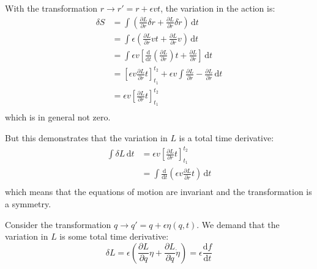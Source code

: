 \documentclass[12pt]{article}
\begin{document}



\pagebreak
\section*{}




With the transformation $r \to r' = r + \epsilon v t$, the variation in the action is:
\begin{equation}
    \begin{split}
        \delta S &= \int \left( \frac{\partial L}{\partial r} \delta r + \frac{\partial L}{\partial \dot{r}} \delta \dot{r} \right) \, \mathrm{d}t \\
        &= \int \epsilon \left( \frac{\partial L}{\partial r} vt + \frac{\partial L}{\partial \dot{r}} v \right) \, \mathrm{d}t \\
        &= \int \epsilon v \left[ \frac{\mathrm{d}}{\mathrm{d}t} \left( \frac{\partial L}{\partial \dot{r}} \right) t + \frac{\partial L}{\partial \dot{r}} \right] \, \mathrm{d}t \\
        &= \left[ \epsilon v \frac{\partial L}{\partial \dot{r}} t \right]_{t_{1}}^{t_{2}} + \epsilon v \int \frac{\partial L}{\partial \dot{r}} - \frac{\partial L}{\partial \dot{r}} \, \mathrm{d}t \\
        &= \epsilon v \left[ \frac{\partial L}{\partial \dot{r}} t \right]_{t_{1}}^{t_{2}} \\
    \end{split}
\end{equation}
which is in general not zero.

But this demonstrates that the variation in $L$ is a total time derivative:
\begin{equation}
    \begin{split}
        \int \delta L \, \mathrm{d}t &= \epsilon v \left[ \frac{\partial L}{\partial \dot{r}} t \right]_{t_{1}}^{t_{2}} \\
        &= \int \frac{\mathrm{d}}{\mathrm{d}t} \left( \epsilon v \frac{\partial L}{\partial \dot{r}} t \right) \, \mathrm{d}t \\
    \end{split}
\end{equation}
which means that the equations of motion are invariant and the transformation is a symmetry.

Consider the transformation $q \to q' = q + \epsilon \eta(q, t)$. We demand that the variation in $L$ is some total time derivative:
\begin{equation}
    \delta L = \epsilon \left( \frac{\partial L}{\partial q} \eta + \frac{\partial L}{\partial \dot{q}} \dot{\eta} \right) = \epsilon \frac{\mathrm{d}f}{\mathrm{d}t}
\end{equation}
\end{document}
